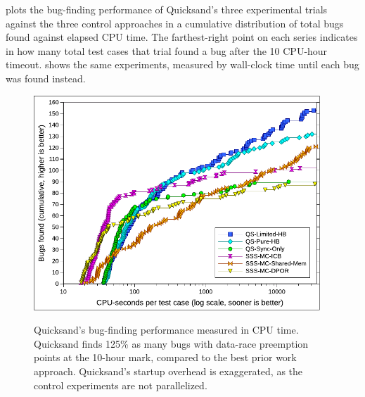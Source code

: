 plots the bug-finding performance of Quicksand's three experimental trials
against the three control approaches
in a cumulative distribution of total bugs found against elapsed CPU time.
The farthest-right point on each series indicates in how many total test cases that trial found a bug
after the 10 CPU-hour timeout.
 shows
the same experiments, measured by wall-clock time until each bug was found instead.

\begin{figure}[h]
	\begin{center}
        \includegraphics[width=0.96\textwidth]{../proposal/dowefindbugsfaster-v2.pdf} \\
	\end{center}
	\caption[Quicksand's bug-finding performance measured in CPU time.]
		{Quicksand's bug-finding performance measured in CPU time.
		Quicksand finds 125\% as many bugs with data-race preemption points at the 10-hour mark,
		compared to the best prior work approach.
		Quicksand's startup overhead is exaggerated, as the control experiments are not parallelized.}
        \label{fig:dowefindbugsfaster-cpu}
\end{figure}
